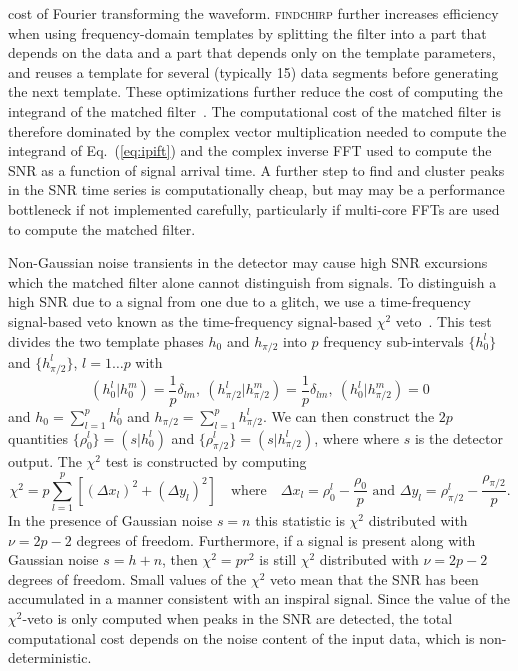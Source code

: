 cost of Fourier transforming the waveform.  \textsc{findchirp} further
increases efficiency when using frequency-domain templates by splitting the
filter into a part that depends on the data and a part that depends only on
the template parameters, and reuses a template for several (typically 15) data
segments before generating the next template.  These optimizations further
reduce the cost of computing the integrand of the matched filter~\cite{Allen:2005fk}. 
The computational cost of the matched filter is therefore dominated by the
complex vector multiplication needed to compute the integrand of Eq.~(\ref{eq:ipift}) and the complex inverse FFT used to compute the SNR as a function of signal arrival time. A further step to find and cluster peaks in the SNR time series is computationally cheap, but may may be a performance bottleneck if not implemented carefully, particularly if multi-core FFTs are used to compute the matched filter.

Non-Gaussian noise transients in the detector may cause
high SNR excursions which the matched filter alone cannot distinguish from
signals. To distinguish a high \ac{SNR} due to a
signal from one due to a glitch, we use a time-frequency signal-based veto known as the time-frequency signal-based
$\chi^2$ veto~\cite{Allen:2004gu}. This test divides 
the two template phases $h_0$ and $h_{\pi/2}$ 
into $p$ frequency sub-intervals $\{h_0^l\}$ and $\{h_{\pi/2}^l\}$, $l=1\ldots p$ with
\begin{equation}
  (h_0^l|h_0^m) = \frac{1}{p}\delta_{lm}, \ 
  (h_{\pi/2}^l|h_{\pi/2}^m) = \frac{1}{p}\delta_{lm}, \ 
  (h_0^l|h_{\pi/2}^m) = 0
\end{equation}
and $h_0=\sum_{l=1}^p h_0^l$ and $h_{\pi/2}=\sum_{l=1}^p h_{\pi/2}^l$. We can
then construct the $2p$ quantities $\{\rho_0^l\}  =(s|h_0^l)$ and $\{\rho_{\pi/2}^l\} = (s|h_{\pi/2}^l)$, where 
where $s$ is the detector output. The $\chi^2$ test is constructed by
computing
\begin{equation}
\chi^2 = p \sum_{l=1}^p \left[ (\Delta x_l)^2 + (\Delta y_l)^2 \right]
\quad\textrm{where}\quad
\Delta x_l = \rho^l_0 - \frac{\rho_0}{p} \textrm{ and }
\Delta y_l = \rho_{\pi/2}^l - \frac{\rho_{\pi/2}}{p}.
\end{equation}
In the presence of Gaussian noise $s=n$ this statistic is $\chi^2$ distributed
with $\nu=2p-2$ degrees of freedom.  Furthermore, if a signal is present along with
Gaussian noise $s=h+n$, then $\chi^2=pr^2$ is still $\chi^2$ distributed
with $\nu=2p-2$ degrees of freedom. Small values of the $\chi^2$ veto mean
that the \ac{SNR} has been accumulated in a manner consistent
with an inspiral signal. Since the value of the $\chi^2$-veto is only computed
when peaks in the \ac{SNR} are detected, the total computational cost depends
on the noise content of the input data, which is non-deterministic. 


